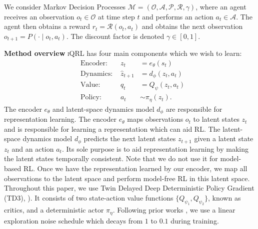 \documentclass{article}
\theoremstyle{plain}
\theoremstyle{definition}
\theoremstyle{remark}
\newcommand{\our}{\textsc{iQRL}\xspace}
\begin{document}
We consider Markov Decision Processes \citep[MDPs,][]{bellmanMarkovianDecisionProcess1957a} $\mathcal{M} = (\mathcal{O}, \mathcal{A}, \mathcal{P}, \mathcal{R}, \gamma)$,
where an agent receives an observation $o_{t} \in \mathcal{O}$ at time step $t$ and performs an action $a_{t} \in \mathcal{A}$.
The agent then obtains a reward $r_{t} = \mathcal{R} (o_{t}, a_{t})$ and obtains the next observation
$o_{t+1} = P(\cdot \mid o_{t}, a_{t})$.
The discount factor is denoted $\gamma \in [0, 1]$.





\textbf{Method overview}
\our has four main components which we wish to learn:
\begin{align}
&\text{Encoder: } & z_{t} &= e_{\theta} (s_{t}) \label{eq:encoder} \\
&\text{Dynamics: } & \hat{z}_{t+1} &= d_{\phi} (z_{t}, a_{t}) \label{eq:transition} \\
&\text{Value: } & q_{t} &= Q_{\psi} (z_{t}, a_{t}) \label{eq:value} \\
&\text{Policy: } & a_{t} &\sim \pi_{\eta} (z_{t}) . \label{eq:policy}
\end{align}
The encoder $e_{\theta}$  and latent-space dynamics model $d_{\phi}$ are responsible for representation learning.
The encoder $e_{\theta}$ maps observations $o_{t}$ to latent states $z_{t}$ and is responsible for learning a representation
which can aid RL.
The latent-space dynamics model $d_{\phi}$ predicts the next latent states $z_{t+1}$ given a latent state $z_{t}$ and an action $a_{t}$.
Its sole purpose is to aid representation learning by making the latent states temporally consistent.
Note that we do not use it for model-based RL.
Once we have the representation learned by our encoder, we map all observations to the latent space and perform model-free RL
in this latent space.
Throughout this paper, we use Twin Delayed Deep Deterministic Policy Gradient
(TD3), \citep{fujimotoAddressingFunctionApproximation2018}).
It consists of two state-action value functions $\{Q_{\psi_{1}},Q_{\psi_{2}} \}$, known as critics, and a deterministic
actor $\pi_{\eta}$.
Following prior works \citep{yaratsMasteringVisualContinuous2021}, we use a linear exploration noise schedule
which decays from $1$ to $0.1$ during training.
\end{document}
